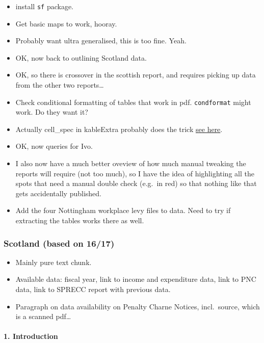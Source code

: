 \documentclass[]{article}
\providecommand{\tightlist}{%
  \setlength{\itemsep}{0pt}\setlength{\parskip}{0pt}}
\let\oldparagraph\paragraph
\renewcommand{\paragraph}[1]{\oldparagraph{#1}\mbox{}}
\begin{document}
\begin{itemize}
{  link}
\item
  install \texttt{sf} package.
\item
  Get basic maps to work, hooray.
\item
  Probably want ultra generalised, this is too fine. Yeah.
\item
  OK, now back to outlining Scotland data.
\item
  OK, so there is crossover in the scottish report, and requires picking
  up data from the other two reports\ldots{}
\item
  Check conditional formatting of tables that work in pdf.
  \texttt{condformat} might work. Do they want it?
\item
  Actually cell\_spec in kableExtra probably does the trick
  \href{https://haozhu233.github.io/kableExtra/awesome_table_in_pdf.pdf}{see
  here}.
\item
  OK, now queries for Ivo.
\item
  I also now have a much better oveview of how much manual tweaking the
  reports will require (not too much), so I have the idea of
  highlighting all the spots that need a manual double check (e.g.~in
  red) so that nothing like that gets accidentally published.
\item
  Add the four Nottingham workplace levy files to data. Need to try if
  extracting the tables works there as well.
\end{itemize}

\hypertarget{scotland-based-on-1617}{%
\subsubsection{Scotland (based on 16/17)}\label{scotland-based-on-1617}}

\begin{itemize}
\tightlist
\item
  Mainly pure text chunk.
\item
  Available data: fiscal year, link to income and expenditure data, link
  to PNC data, link to SPRECC report with previous data.
\item
  Paragraph on data availability on Penalty Charne Notices,
  incl.~source, which is a scanned pdf\ldots{}
\end{itemize}

\hypertarget{introduction}{%
\paragraph{1. Introduction}\label{introduction}}
\end{document}
